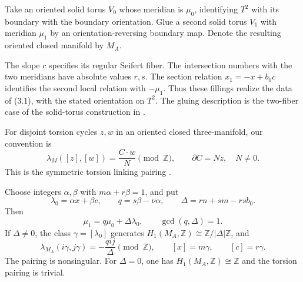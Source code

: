 \documentclass[11pt]{article}
\numberwithin{equation}{section}
\begin{document}
Take an oriented solid torus $V_0$ whose meridian is $\mu_0$, identifying
$T^2$ with its boundary with the boundary orientation.
Glue a second solid torus $V_1$ with meridian $\mu_1$ by an
orientation-reversing boundary map.  Denote the resulting oriented
closed manifold by $M_A$.

The slope $c$ specifies its regular Seifert fiber.  The intersection
numbers with the two meridians have absolute values $r,s$.
The section relation $x_1=-x+b_0c$ identifies the second local
relation with $-\mu_1$.  Thus these fillings realize the data of (3.1),
with the stated orientation on $T^2$.
The gluing description is the two-fiber case of the solid-torus
construction in \cite[Section~2.1, pp.~25--27]{Hatcher}.

For disjoint torsion cycles $z,w$ in an oriented closed three-manifold,
our convention is
\[
 \lambda_M([z],[w])=\frac{C\cdot w}{N}\pmod{\mathbb Z},
             \qquad \partial C=Nz,\quad N\ne0.
\]
This is the symmetric torsion linking pairing
\cite[Section~1, pp.~2--3]{Hillman}.

\begin{theorem}\label{thm:linking}
Choose integers $\alpha,\beta$ with $m\alpha+r\beta=1$, and put
\begin{equation}\label{eq:linking-coordinates}
 \lambda_0=\alpha x+\beta c,\qquad
 q=s\beta-\nu\alpha,\qquad \Delta=rn+sm-rsb_0.
\end{equation}
Then
\[
       \mu_1=q\mu_0+\Delta\lambda_0,\qquad
       \gcd(q,\Delta)=1.
\]
If $\Delta\ne0$, the class $\gamma=[\lambda_0]$ generates
$H_1(M_A,\mathbb Z)\cong\mathbb Z/|\Delta|\mathbb Z$, and
\begin{equation}\label{eq:linking-formula}
 \lambda_{M_A}(i\gamma,j\gamma)=-\frac{qij}{\Delta}
            \pmod{\mathbb Z},\qquad
 [x]=m\gamma,\qquad[c]=r\gamma.
\end{equation}
The pairing is nonsingular.  For $\Delta=0$, one has
$H_1(M_A,\mathbb Z)\cong\mathbb Z$ and the torsion pairing is trivial.
\end{theorem}
\end{document}
